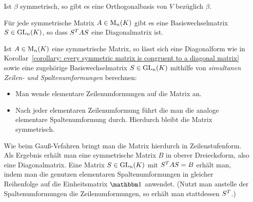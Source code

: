 \begin{theorem}
  \label{theorem: exstience of an orthogonal basis}
  Ist $\beta$ symmetrisch, so gibt es eine Orthogonalbasis von $V$ bezüglich $\beta$.
\end{theorem}

\begin{corollary}
  \label{corollary: every symmetric matrix is congruent to a diagonal matrix}
  Für jede symmetrische Matrix $A \in \operatorname{M}_{n}(K)$ gibt es eine Basiswechselmatrix $S \in \operatorname{GL}_{n}(K)$, so dass $S^T A S$ eine Diagonalmatrix ist.
\end{corollary}

Ist $A \in \operatorname{M}_{n}(K)$ eine symmetrische Matrix, so lässt sich eine Diagonalform wie in Korollar~\ref{corollary: every symmetric matrix is congruent to a diagonal matrix} sowie eine zugehörige Basiswechselmatrix $S \in \operatorname{GL}_{n}(K)$ mithilfe von \emph{simultanen Zeilen- und Spaltenumformungen} berechnen:
\begin{itemize}
  \item
    Man wende elementare Zeilenumformungen auf die Matrix an.
  \item
    Nach jeder elementaren Zeilenumformung führt die man die analoge elementare Spaltenumformung durch.
    Hierdurch bleibt die Matrix symmetrisch.
\end{itemize}
Wie beim Gauß-Vefahren bringt man die Matrix hierdurch in Zeilenstufenform.
Als Ergebnis erhält man eine symmetrische Matrix $B$ in oberer Dreiecksform, also eine Diagonalmatrix.
Eine Matrix $S \in \operatorname{GL}_{n}(K)$ mit $S^T A S = B$ erhält man, indem man die genutzen elementaren Spaltenumformungen in gleicher Reihenfolge auf die Einheitsmatrix $\Id$ anwendet.
(Nutzt man anstelle der Spaltenumformungen die Zeilenumformungen, so erhält man stattdessen $S^T$.)

